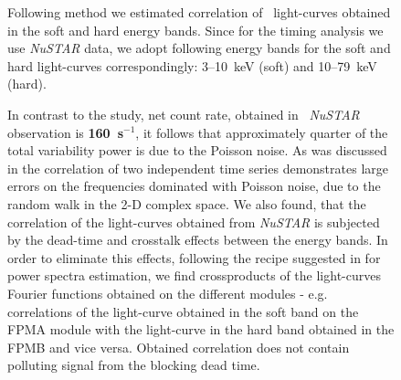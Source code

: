 \begin{figure}
Following method \citep{nowak99} we estimated correlation of \grs\ light-curves obtained in the soft and hard energy bands. 
Since for the timing analysis we use {\it NuSTAR} data, we adopt following energy bands for the soft and hard light-curves correspondingly: 3--10~keV (soft) and 10--79~keV (hard).

In contrast to the \citep{nowak99} study, net count rate, obtained in \grs\ {\it NuSTAR} observation is {\bf 160~s$^{-1}$}, it follows that approximately quarter of the total variability power is due to the Poisson noise. 
As was discussed in \citep{nowak99} the correlation of two independent time series demonstrates large errors on the frequencies dominated with Poisson noise, due to the random walk in the 2-D complex space.
We also found, that the correlation of the light-curves obtained from {\it NuSTAR} is subjected by the dead-time and crosstalk effects between the energy bands.
In order to eliminate this effects, following the recipe suggested in \cite{2015ApJ...800..109B} for power spectra estimation, we find crossproducts of the light-curves Fourier functions obtained on the different modules - e.g. correlations of the light-curve obtained in the soft band on the FPMA module with the light-curve in the hard band obtained in the FPMB and vice versa.
Obtained correlation does not contain polluting signal from the blocking dead time. 


\end{figure}

